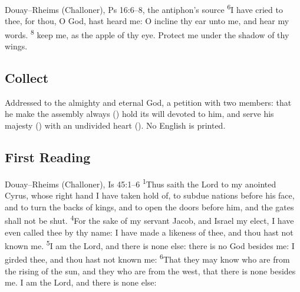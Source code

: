 \begin{englishwitness}{Douay--Rheims (Challoner), Ps 16:6--8, the antiphon's source}
\textsuperscript{6}I have cried to thee, for thou, O God, hast heard me: O
incline thy ear unto me, and hear my words. 
\textsuperscript{8} keep me, as
the apple of thy eye. Protect me under the shadow of thy wings.
\end{englishwitness}

\subsection{Collect}
\label{proper-collect}


\noindent Addressed to the almighty and eternal God, a petition with two
members: that he make the assembly always () hold its will
devoted to him, and serve his majesty ()
with an undivided heart (). No English is printed.

\subsection{First Reading}
\label{proper-first-reading}


\begin{englishwitness}{Douay--Rheims (Challoner), Is 45:1--6}
\textsuperscript{1}Thus saith the Lord to my anointed Cyrus, whose right hand
I have taken hold of, to subdue nations before his face, and to turn the backs
of kings, and to open the doors before him, and the gates shall not be shut.
\textsuperscript{4}For the sake of my servant Jacob, and Israel my elect, I
have even called thee by thy name: I have made a likeness of thee, and thou
hast not known me. \textsuperscript{5}I am the Lord, and there is none else:
there is no God besides me: I girded thee, and thou hast not known me:
\textsuperscript{6}That they may know who are from the rising of the sun, and
they who are from the west, that there is none besides me. I am the Lord, and
there is none else:
\end{englishwitness}


